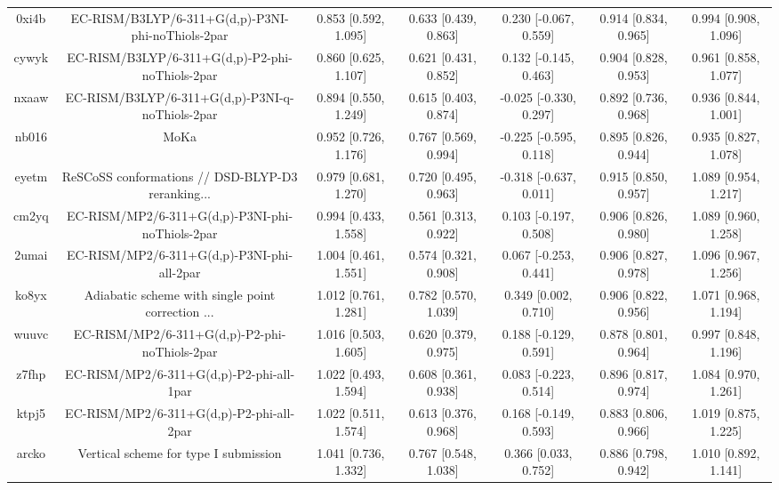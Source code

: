 \documentclass{article}
\begin{document}
\begin{center}
\begin{longtable}{|ccccccc|}
 0xi4b &  EC-RISM/B3LYP/6-311+G(d,p)-P3NI-phi-noThiols-2par &  0.853 [0.592, 1.095] &  0.633 [0.439, 0.863] &   0.230 [-0.067, 0.559] &  0.914 [0.834, 0.965] &   0.994 [0.908, 1.096] \\
 cywyk &    EC-RISM/B3LYP/6-311+G(d,p)-P2-phi-noThiols-2par &  0.860 [0.625, 1.107] &  0.621 [0.431, 0.852] &   0.132 [-0.145, 0.463] &  0.904 [0.828, 0.953] &   0.961 [0.858, 1.077] \\
 nxaaw &    EC-RISM/B3LYP/6-311+G(d,p)-P3NI-q-noThiols-2par &  0.894 [0.550, 1.249] &  0.615 [0.403, 0.874] &  -0.025 [-0.330, 0.297] &  0.892 [0.736, 0.968] &   0.936 [0.844, 1.001] \\
 nb016 &                                               MoKa &  0.952 [0.726, 1.176] &  0.767 [0.569, 0.994] &  -0.225 [-0.595, 0.118] &  0.895 [0.826, 0.944] &   0.935 [0.827, 1.078] \\
 eyetm &  ReSCoSS conformations // DSD-BLYP-D3 reranking... &  0.979 [0.681, 1.270] &  0.720 [0.495, 0.963] &  -0.318 [-0.637, 0.011] &  0.915 [0.850, 0.957] &   1.089 [0.954, 1.217] \\
 cm2yq &    EC-RISM/MP2/6-311+G(d,p)-P3NI-phi-noThiols-2par &  0.994 [0.433, 1.558] &  0.561 [0.313, 0.922] &   0.103 [-0.197, 0.508] &  0.906 [0.826, 0.980] &   1.089 [0.960, 1.258] \\
 2umai &         EC-RISM/MP2/6-311+G(d,p)-P3NI-phi-all-2par &  1.004 [0.461, 1.551] &  0.574 [0.321, 0.908] &   0.067 [-0.253, 0.441] &  0.906 [0.827, 0.978] &   1.096 [0.967, 1.256] \\
 ko8yx &  Adiabatic scheme with single point correction ... &  1.012 [0.761, 1.281] &  0.782 [0.570, 1.039] &    0.349 [0.002, 0.710] &  0.906 [0.822, 0.956] &   1.071 [0.968, 1.194] \\
 wuuvc &      EC-RISM/MP2/6-311+G(d,p)-P2-phi-noThiols-2par &  1.016 [0.503, 1.605] &  0.620 [0.379, 0.975] &   0.188 [-0.129, 0.591] &  0.878 [0.801, 0.964] &   0.997 [0.848, 1.196] \\
 z7fhp &           EC-RISM/MP2/6-311+G(d,p)-P2-phi-all-1par &  1.022 [0.493, 1.594] &  0.608 [0.361, 0.938] &   0.083 [-0.223, 0.514] &  0.896 [0.817, 0.974] &   1.084 [0.970, 1.261] \\
 ktpj5 &           EC-RISM/MP2/6-311+G(d,p)-P2-phi-all-2par &  1.022 [0.511, 1.574] &  0.613 [0.376, 0.968] &   0.168 [-0.149, 0.593] &  0.883 [0.806, 0.966] &   1.019 [0.875, 1.225] \\
 arcko &              Vertical scheme for type I submission &  1.041 [0.736, 1.332] &  0.767 [0.548, 1.038] &    0.366 [0.033, 0.752] &  0.886 [0.798, 0.942] &   1.010 [0.892, 1.141] \\

\end{longtable}
\end{center}
\end{document}
